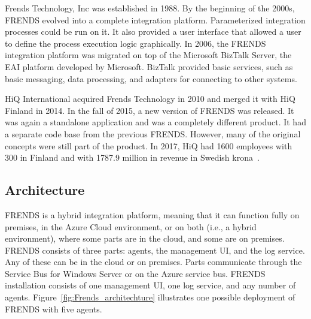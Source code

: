 \documentclass[english, 12pt, a4paper, sci, utf8, a-2b, online, obeyspaces]{aaltothesis}
\begin{document}

Frends Technology, Inc was established in 1988. By the beginning of the 2000s, FRENDS evolved into a complete integration platform. Parameterized integration processes could be run on it. It also provided a user interface that allowed a user to define the process execution logic graphically. In 2006, the FRENDS integration platform was migrated on top of the Microsoft BizTalk Server, the EAI platform developed by Microsoft. BizTalk provided basic services, such as basic messaging, data processing, and adapters for connecting to other systems.

HiQ International acquired Frends Technology in 2010 and merged it with HiQ Finland in 2014. In the fall of 2015, a new version of FRENDS was released. It was again a standalone application and was a completely different product. It had a separate code base from the previous FRENDS. However, many of the original concepts were still part of the product. In 2017, HiQ had 1600 employees with 300 in Finland and with 1787.9 million in revenue in Swedish krona~\cite{hiq2018financial}.

\subsection{Architecture}
\label{sec:architecture}
FRENDS is a hybrid integration platform, meaning that it can function fully on premises, in the Azure Cloud environment, or on both (i.e., a hybrid environment), where some parts are in the cloud, and some are on premises. FRENDS consists of three parts: agents, the management UI, and the log service. Any of these can be in the cloud or on premises. Parts communicate through the Service Bus for Windows Server or on the Azure service bus. FRENDS installation consists of one management UI, one log service, and any number of agents. Figure~\ref{fig:Frends_architechture} illustrates one possible deployment of FRENDS with five agents.
\end{document}

